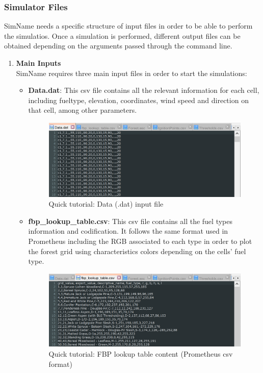 \documentclass[11pt]{article}
\begin{document}
\subsubsection{Simulator Files}
SimName needs a specific structure of input files in order to be able to perform the simulatios. Once a simulation is performed, different output files can be obtained depending on the arguments passed through the command line.
\begin{enumerate}
		
	\item \textbf{Main Inputs}\\
	SimName requires three main input files in order to start the simulations:
	\begin{itemize}
		\item \textbf{Data.dat}: This csv file contains all the relevant information for each cell, including fueltype, elevation, coordinates, wind speed and direction on that cell, among other parameters.
	
\begin{figure}[h!]
\centering
\includegraphics[scale=0.6]{Tutorial4.png}
\caption{\label{fig:Tut4} Quick tutorial: Data (.dat) input file}
\end{figure}	
	
		\item \textbf{fbp\_lookup\_table.csv}: 	This csv file contains all the fuel types information and codification. It follows the same format used in Prometheus including the RGB associated to each type in order to plot the forest grid using characteristics colors depending on the cells' fuel type.
		
		
\begin{figure}[h!]
\centering
\includegraphics[scale=0.6]{Tutorial5.png}
\caption{\label{fig:Tut5} Quick tutorial: FBP lookup table  content (Prometheus csv format)}
\end{figure}
			

\end{itemize}
\end{enumerate}
\end{document}
